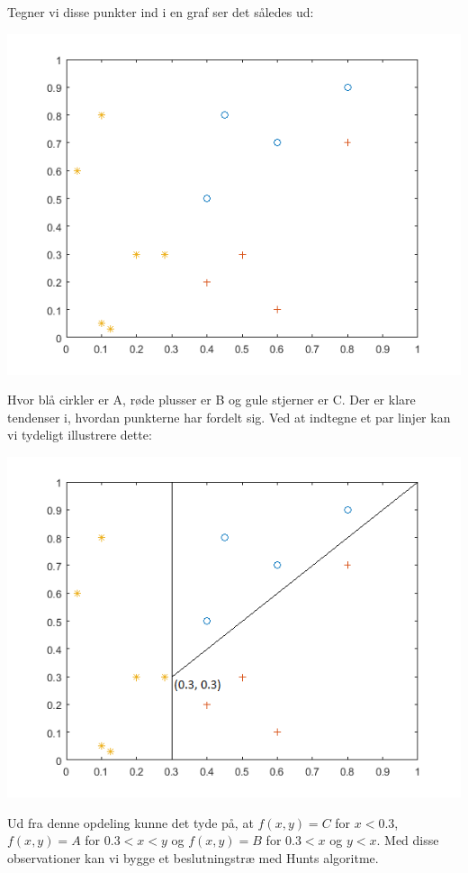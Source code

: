 \documentclass{article}
\begin{document}
Tegner vi disse punkter ind i en graf ser det således ud:
\begin{center}
	\includegraphics{decision_tree_example_plot}
\end{center}
Hvor blå cirkler er A, røde plusser er B og gule stjerner er C. Der er klare tendenser i, hvordan punkterne har fordelt sig. Ved at indtegne et par linjer kan vi tydeligt illustrere dette:
\begin{center}
	\includegraphics{decision_tree_example_plot_splitted}
\end{center}
Ud fra denne opdeling kunne det tyde på, at $f(x,y)=C$ for $x<0.3$, $f(x,y)=A$ for $0.3<x<y$ og $f(x,y)=B$ for $0.3<x$ og $y<x$. Med disse observationer kan vi bygge et beslutningstræ med Hunts algoritme.
\end{document}
